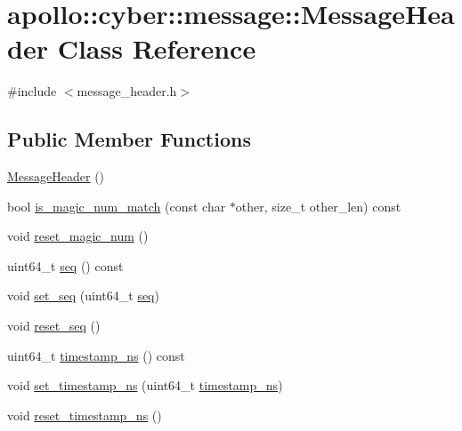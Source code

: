\hypertarget{classapollo_1_1cyber_1_1message_1_1MessageHeader}{\section{apollo\-:\-:cyber\-:\-:message\-:\-:Message\-Header Class Reference}
\label{classapollo_1_1cyber_1_1message_1_1MessageHeader}
}


{\ttfamily \#include $<$message\-\_\-header.\-h$>$}

\subsection*{Public Member Functions}
\begin{DoxyCompactItemize}
\item 
\hyperlink{classapollo_1_1cyber_1_1message_1_1MessageHeader_af52824de447d4a7df048d222a35c5a77}{Message\-Header} ()
\item 
bool \hyperlink{classapollo_1_1cyber_1_1message_1_1MessageHeader_a98acea330d88e7b1e51a23096f6b9d48}{is\-\_\-magic\-\_\-num\-\_\-match} (const char $\ast$other, size\-\_\-t other\-\_\-len) const 
\item 
void \hyperlink{classapollo_1_1cyber_1_1message_1_1MessageHeader_a598229cf13fd5fc274e99570d5fd722f}{reset\-\_\-magic\-\_\-num} ()
\item 
uint64\-\_\-t \hyperlink{classapollo_1_1cyber_1_1message_1_1MessageHeader_a3a64ad940f8cda65f9b87f619a9393c3}{seq} () const 
\item 
void \hyperlink{classapollo_1_1cyber_1_1message_1_1MessageHeader_a6e71f588723345e5dd88dc2ae29fcd9b}{set\-\_\-seq} (uint64\-\_\-t \hyperlink{classapollo_1_1cyber_1_1message_1_1MessageHeader_a3a64ad940f8cda65f9b87f619a9393c3}{seq})
\item 
void \hyperlink{classapollo_1_1cyber_1_1message_1_1MessageHeader_a7ebaa59d78b24a1cc1c937bb0359dfd5}{reset\-\_\-seq} ()
\item 
uint64\-\_\-t \hyperlink{classapollo_1_1cyber_1_1message_1_1MessageHeader_abe2dd963a2e3919d7206fc28f2fe5ef5}{timestamp\-\_\-ns} () const 
\item 
void \hyperlink{classapollo_1_1cyber_1_1message_1_1MessageHeader_a17b0f9ea407b931d803e87ace9920faf}{set\-\_\-timestamp\-\_\-ns} (uint64\-\_\-t \hyperlink{classapollo_1_1cyber_1_1message_1_1MessageHeader_abe2dd963a2e3919d7206fc28f2fe5ef5}{timestamp\-\_\-ns})
\item 
void \hyperlink{classapollo_1_1cyber_1_1message_1_1MessageHeader_ab2c896c0ab9630789737b3526c1576e5}{reset\-\_\-timestamp\-\_\-ns} ()

\end{DoxyCompactItemize}
